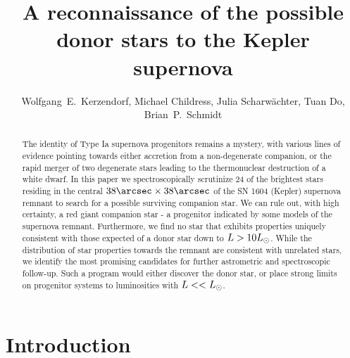 \documentclass[preprint2]{aastex}
\begin{document}
\title{A reconnaissance of the possible donor stars to the Kepler supernova}

\author{Wolfgang~E.~Kerzendorf, Michael Childress, Julia Scharw\"{a}chter, Tuan Do, Brian~P.~Schmidt} 






\begin{abstract}
The identity of Type Ia supernova progenitors remains a mystery, with various lines of evidence pointing towards either
accretion from a non-degenerate companion, or the rapid merger of two degenerate stars leading to the thermonuclear destruction of a white dwarf.
In this paper we spectroscopically scrutinize 24 of the brightest stars residing in the central $38\arcsec \times 38\arcsec$ of the SN 1604 (Kepler) supernova remnant  to search for a possible surviving companion star. We can rule out, with high certainty, a red giant companion star - a progenitor indicated by some models of the supernova remnant.  Furthermore, we find no star that exhibits properties uniquely consistent with those expected of a donor star down to $L>10\hbox{$L_{\odot}$} $. While the 
distribution of star properties towards the remnant are consistent with unrelated stars, we identify the most promising candidates for further astrometric and spectroscopic follow-up. Such a program would either discover the donor star, or place strong limits on progenitor systems to luminosities with $L << \hbox{$L_{\odot}$}$.
\end{abstract}

\maketitle
\section{Introduction}
\end{document}
